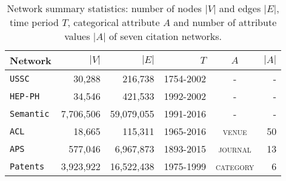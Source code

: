 \begin{table}[H]
 {
  \begin{tabular}[c]{lrrrcr} \toprule
   Network & $|V|$           & $|E|$        & $T$        & $A$              & $|A|$ \\ \midrule
   \texttt{USSC}         & 30,288     & 216,738      & 1754-2002  & - & -                  \\
   \texttt{HEP-PH}       & 34,546     & 421,533      & 1992-2002  & - & -                  \\
   \texttt{Semantic}     & 7,706,506  & 59,079,055   & 1991-2016  & - & -                  \\   \midrule
   \texttt{ACL}          & 18,665     & 115,311      & 1965-2016  & \textsc{venue} & 50    \\
   \texttt{APS}          & 577,046    & 6,967,873    & 1893-2015  & \textsc{journal} & 13   \\
   \texttt{Patents}      & 3,923,922  & 16,522,438   & 1975-1999  & \textsc{category} & 6  \\
  \bottomrule
  \end{tabular}
  \vspace{1mm}
  \caption{Network summary statistics: number of nodes $|V|$ and edges $|E|$, time period
  $T$, categorical attribute $A$ and number of attribute values $|A|$ of seven citation networks.}
  \label{table:datasets}
 }
\end{table}

